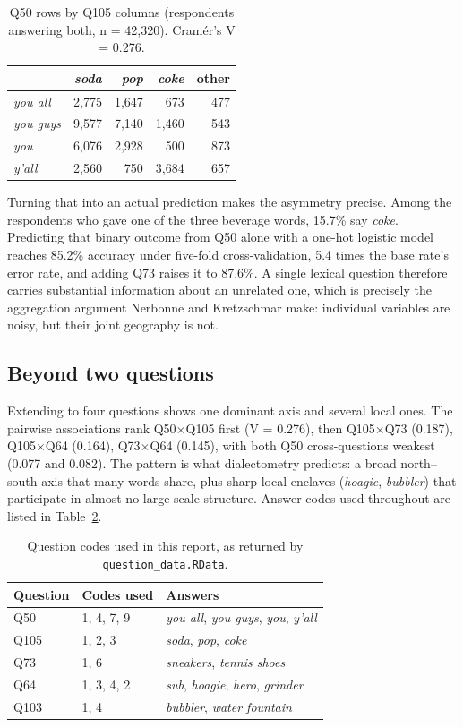 \documentclass[10pt,letterpaper]{article}
\begin{document}
\begin{table}[h]
\centering
\begin{tabular}{lrrrr}
\hline
 & \emph{soda} & \emph{pop} & \emph{coke} & other \\
\hline
\emph{you all} & 2,775 & 1,647 & 673 & 477 \\
\emph{you guys} & 9,577 & 7,140 & 1,460 & 543 \\
\emph{you} & 6,076 & 2,928 & 500 & 873 \\
\emph{y'all} & 2,560 & 750 & 3,684 & 657 \\
\hline
\end{tabular}
\caption{Q50 rows by Q105 columns (respondents answering both, n = 42,320).
Cram\'er's V = 0.276.}
\label{tab:joint}
\end{table}

Turning that into an actual prediction makes the asymmetry precise. Among the
respondents who gave one of the three beverage words, 15.7\% say \emph{coke}.
Predicting that binary outcome from Q50 alone with a one-hot logistic model
reaches 85.2\% accuracy under five-fold cross-validation, 5.4 times the base
rate's error rate, and adding Q73 raises it to 87.6\%. A single
lexical question therefore carries substantial information about an unrelated
one, which is precisely the aggregation argument Nerbonne and Kretzschmar
make: individual variables are noisy, but their joint geography is not.

\subsection{Beyond two questions}

Extending to four questions shows one dominant axis and several local ones.
The pairwise associations rank Q50$\times$Q105 first (V = 0.276), then
Q105$\times$Q73 (0.187), Q105$\times$Q64 (0.164), Q73$\times$Q64 (0.145), with
both Q50 cross-questions weakest (0.077 and 0.082). The pattern is what
dialectometry predicts: a broad north--south axis that many words share, plus
sharp local enclaves (\emph{hoagie}, \emph{bubbler}) that participate in
almost no large-scale structure. Answer codes used throughout are listed in
Table~\ref{tab:codes}.

\begin{table}[h]
\centering
\begin{tabular}{lll}
\hline
Question & Codes used & Answers \\
\hline
Q50 & 1, 4, 7, 9 & \emph{you all}, \emph{you guys}, \emph{you}, \emph{y'all} \\
Q105 & 1, 2, 3 & \emph{soda}, \emph{pop}, \emph{coke} \\
Q73 & 1, 6 & \emph{sneakers}, \emph{tennis shoes} \\
Q64 & 1, 3, 4, 2 & \emph{sub}, \emph{hoagie}, \emph{hero}, \emph{grinder} \\
Q103 & 1, 4 & \emph{bubbler}, \emph{water fountain} \\
\hline
\end{tabular}
\caption{Question codes used in this report, as returned by
\texttt{question\_data.RData}.}
\label{tab:codes}
\end{table}
\end{document}
